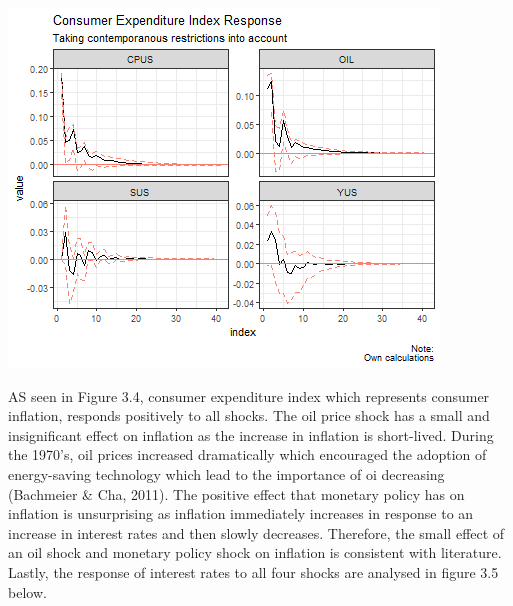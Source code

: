 \documentclass[11pt,preprint, authoryear]{elsarticle}
\let\origfigure\figure
\let\endorigfigure\endfigure
\renewenvironment{figure}[1][2] {
    \expandafter\origfigure\expandafter[H]
} {
    \endorigfigure
}
\numberwithin{equation}{section}
\numberwithin{figure}{section}
\numberwithin{table}{section}
\begin{document}
\begin{figure}[H]

{\centering \includegraphics{replication_files/figure-latex/Figure4-1} 

}

\caption{Consumer Expenditure Index\label{Figure4}}\label{fig:Figure4}
\end{figure}

AS seen in Figure 3.4, consumer expenditure index which represents
consumer inflation, responds positively to all shocks. The oil price
shock has a small and insignificant effect on inflation as the increase
in inflation is short-lived. During the 1970's, oil prices increased
dramatically which encouraged the adoption of energy-saving technology
which lead to the importance of oi decreasing (Bachmeier \& Cha, 2011).
The positive effect that monetary policy has on inflation is
unsurprising as inflation immediately increases in response to an
increase in interest rates and then slowly decreases. Therefore, the
small effect of an oil shock and monetary policy shock on inflation is
consistent with literature. Lastly, the response of interest rates to
all four shocks are analysed in figure 3.5 below.
\end{document}
